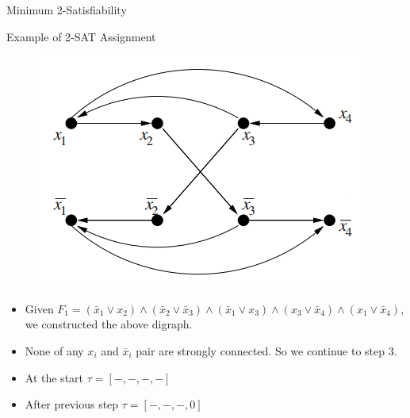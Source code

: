 \documentclass[xcolor=svgnames]{beamer}
\begin{document}
\begin{section}{Minimum 2-Satisfiability}
    \begin{frame}{Example of 2-SAT Assignment}
        \small
        \begin{figure}
            \centering
            \includegraphics[width=0.5\linewidth]{graph.png}
            \label{fig:enter-label}
        \end{figure}
        \begin{itemize}
            \item<1-> Given \( F_1 = (\bar{x}_1 \lor x_2) \land (\bar{x}_2 \lor \bar{x}_3) \land (\bar{x}_1 \lor x_3) \land (x_3 \lor \bar{x}_4) \land (x_1 \lor \bar{x}_4) \), we constructed the above digraph.
            \item<2> None of any $x_i$ and $\bar{x}_i$ pair are strongly connected. So we continue to step 3.
            \vspace{-2.5em}
            \item<3> At the start $\tau=[-,-,-,-]$
            \vspace{-2.5em}
            \item<4> After previous step $\tau=[-,-,-,0]$
\end{itemize}
\end{frame}
\end{section}
\end{document}
